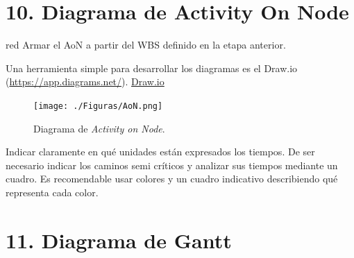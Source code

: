 \documentclass[
11pt, %
]{charter}
\begin{document}
\section{10. Diagrama de Activity On Node}
\label{sec:AoN}

\begin{consigna}{red}
Armar el AoN a partir del WBS definido en la etapa anterior.

Una herramienta simple para desarrollar los diagramas es el Draw.io (\url{https://app.diagrams.net/}).
\href{https://app.diagrams.net}{Draw.io}


\begin{figure}[htpb]
\centering 
\texttt{[image: ./Figuras/AoN.png]}
\caption{Diagrama de \textit{Activity on Node}.}
\label{fig:AoN}
\end{figure}

Indicar claramente en qué unidades están expresados los tiempos.
De ser necesario indicar los caminos semi críticos y analizar sus tiempos mediante un cuadro.
Es recomendable usar colores y un cuadro indicativo describiendo qué representa cada color.

\end{consigna}

\section{11. Diagrama de Gantt}
\label{sec:gantt}
\end{document}
